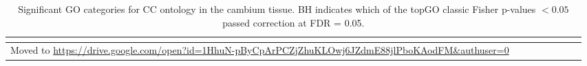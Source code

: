 \begin{longtable}{llllrlrr}
\caption{Significant GO categories for CC ontology in the cambium tissue. BH indicates which of the topGO classic Fisher p-values $< 0.05$ passed correction at FDR = 0.05.}\\
\label{tab:go-cambium-CC}\\
\toprule
    Moved to \scriptsize{\url{https://drive.google.com/open?id=1HhuN-pByCpArPCZjZhuKLOwj6JZdmE88jlPboKAodFM&authuser=0}} \\
\bottomrule
\end{longtable}
